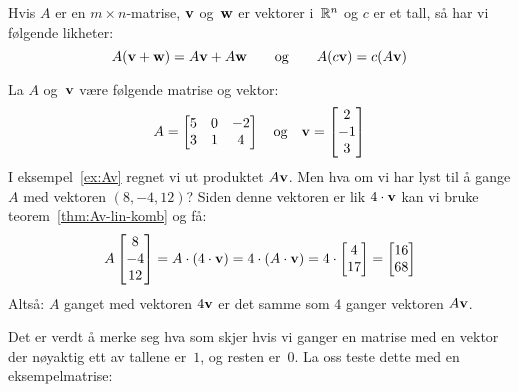\begin{thm}
\label{thm:Av-lin-komb}
Hvis $A$ er en $m \times n$-matrise, $\mathbf{v}$ og~$\mathbf{w}$ er vektorer
i~$\mathbb{R}^n$ og $c$ er et tall, så har vi følgende likheter:
\[
A (\mathbf{v} + \mathbf{w}) = A \mathbf{v} + A \mathbf{w}
\qquad\text{og}\qquad
A (c \mathbf{v}) = c (A \mathbf{v})
\]
\end{thm}

\begin{ex}
La $A$ og~$\mathbf{v}$ være følgende matrise og vektor:
\[
A =
\begin{bmatrix}
5 & 0 & -2 \\
3 & 1 &  4
\end{bmatrix}
\quad\text{og}\quad
\mathbf{v} = \begin{bmatrix} 2 \\ -1 \\ 3 \end{bmatrix}
\]
I eksempel~\ref{ex:Av} regnet vi ut produktet $A \mathbf{v}$.
Men hva om vi har lyst til å gange $A$ med vektoren $(8, -4, 12)$?
Siden denne vektoren er lik $4 \cdot \mathbf{v}$ kan vi bruke
teorem~\ref{thm:Av-lin-komb} og få:
\[
A \begin{bmatrix} 8 \\ -4 \\ 12 \end{bmatrix}
= A \cdot (4 \cdot \mathbf{v})
= 4 \cdot (A \cdot \mathbf{v})
= 4 \cdot \begin{bmatrix} 4 \\ 17 \end{bmatrix}
= \begin{bmatrix} 16 \\ 68 \end{bmatrix}
\]
Altså: $A$ ganget med vektoren $4 \mathbf{v}$ er det samme som $4$ ganger
vektoren $A \mathbf{v}$.
\end{ex}

Det er verdt å merke seg hva som skjer hvis vi ganger en matrise med
en vektor der nøyaktig ett av tallene er~$1$, og resten er~$0$.  La
oss teste dette med en eksempelmatrise:

